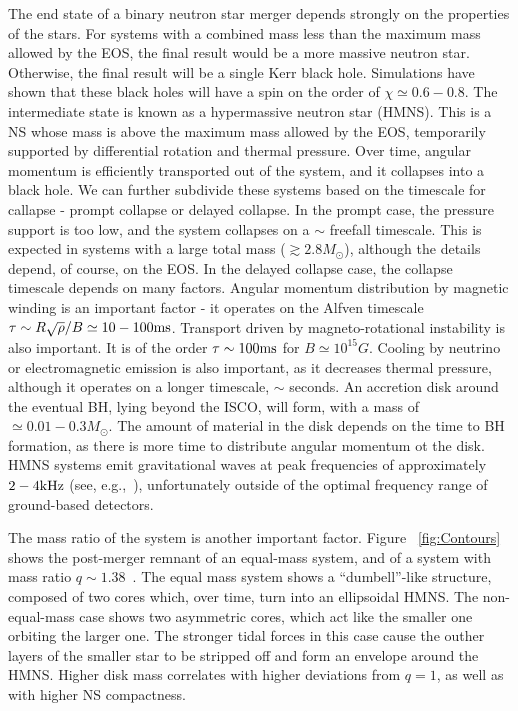 The end state of a binary neutron star merger depends strongly on the properties of the stars. For systems with a combined mass less than the maximum mass allowed by the EOS, the final result would be a more massive neutron star. Otherwise, the final result will be a single Kerr black hole. Simulations have shown that these black holes will have a spin on the order of $\chi \simeq 0.6-0.8$. The intermediate state is known as a hypermassive neutron star (HMNS). This is a NS whose mass is above the maximum mass allowed by the EOS, temporarily supported by differential rotation and thermal pressure. Over time, angular momentum is efficiently transported out of the system, and it collapses into a black hole. We can further subdivide these systems based on the timescale for callapse - prompt collapse or delayed collapse. In the prompt case, the pressure support is too low, and the system collapses on a $\sim$ freefall timescale. This is expected in systems with a large total mass ($\gtrsim 2.8M_{\odot}$), although the details depend, of course, on the EOS. In the delayed collapse case, the collapse timescale depends on many factors. Angular momentum distribution by magnetic winding is an important factor - it operates on the Alfven timescale $\tau \sim R\sqrt{\rho}/B \simeq 10-100{\rm ms}$. Transport driven by magneto-rotational instability is also important. It is of the order $\tau \sim 100{\rm ms}$ for $B \simeq 10^{15}G$. Cooling by neutrino or electromagnetic emission is also important, as it decreases thermal pressure, although it operates on a longer timescale, $\sim$ seconds. An accretion disk around the eventual BH, lying beyond the ISCO, will form, with a mass of $\simeq 0.01-0.3 M_{\odot}$. The amount of material in the disk depends on the time to BH formation, as there is more time to distribute angular momentum ot the disk. HMNS systems emit gravitational waves at peak frequencies of approximately $2-4 {\rm kHz}$ (see, e.g.,~\cite{Hotokezaka:2011dh}), unfortunately outside of the optimal frequency range of ground-based detectors. 

The mass ratio of the system is another important factor. Figure ~\ref{fig:Contours} shows the post-merger remnant of an equal-mass system, and of a system with mass ratio $q\sim 1.38$~\citep{Rezzolla:2010fd}. The equal mass system shows a ``dumbell''-like structure, composed of two cores which, over time, turn into an ellipsoidal HMNS. The non-equal-mass case shows two asymmetric cores, which act like the smaller one orbiting the larger one. The stronger tidal forces in this case cause the outher layers of the smaller star to be stripped off and form an envelope around the HMNS. Higher disk mass correlates with higher deviations from $q=1$, as well as with higher NS compactness.

